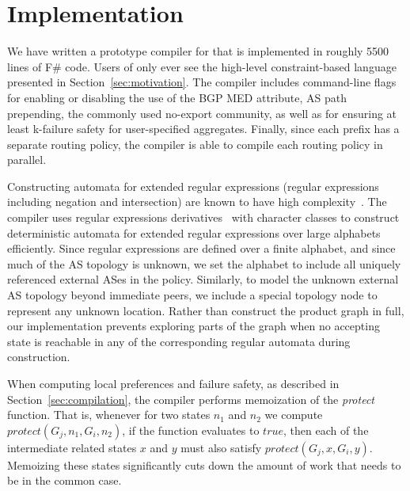 \section{Implementation}
\label{sec:implementation}

We have written a prototype compiler for \sysname that is implemented in roughly 5500 lines of F\# code. Users of \sysname only ever see the high-level constraint-based language presented in Section~\ref{sec:motivation}. The compiler includes command-line flags for enabling or disabling the use of the BGP MED attribute, AS path prepending, the commonly used no-export community, as well as for ensuring at least k-failure safety for user-specified aggregates. Finally, since each prefix has a separate routing policy, the \sysname compiler is able to compile each routing policy in parallel. 


Constructing automata for extended regular expressions (regular expressions including negation and intersection) are known to have high complexity~\cite{regex-complexity}. The \sysname compiler uses regular expressions derivatives~\cite{regex-derivatives} with character classes to construct deterministic automata for extended regular expressions over large alphabets efficiently. Since regular expressions are defined over a finite alphabet, and since much of the AS topology is unknown, we set the alphabet to include all uniquely referenced external ASes in the policy. Similarly, to model the unknown external AS topology beyond immediate peers, we include a special topology node to represent any unknown location.
%
Rather than construct the product graph in full, our implementation prevents exploring parts of the graph when no accepting state is reachable in any of the corresponding regular automata during construction.




When computing local preferences and failure safety, as described in Section~\ref{sec:compilation}, the compiler performs memoization of the \textit{protect} function. That is, whenever for two states $n_1$ and $n_2$ we compute $protect(G_j, n_1, G_i, n_2)$, if the function evaluates to $true$, then each of the intermediate related states $x$ and $y$ must also satisfy $protect(G_j, x, G_i, y)$. Memoizing these states significantly cuts down the amount of work that needs to be in the common case.

